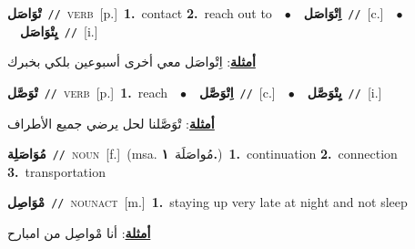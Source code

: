 \documentclass[10pt,a4paper,twoside]{article} %
\begin{document}
\begin{multicols}{2}
{\setlength\topsep{0pt}\textbf{\foreignlanguage{arabic}{تْوَاصَل}}\ {\color{gray}\texttt{//}\color{black}}\ \textsc{verb}\ [p.]\ \textbf{1.}~contact  \textbf{2.}~reach out to\ \ $\bullet$\ \ \setlength\topsep{0pt}\textbf{\foreignlanguage{arabic}{اِتْوَاصَل}}\ {\color{gray}\texttt{//}\color{black}}\ [c.]\ \ $\bullet$\ \ \setlength\topsep{0pt}\textbf{\foreignlanguage{arabic}{يِتْوَاصَل}}\ {\color{gray}\texttt{//}\color{black}}\ [i.]\  \begin{flushright}\color{gray}\foreignlanguage{arabic}{\textbf{\underline{\foreignlanguage{arabic}{أمثلة}}}: اِتْواصَل معي أخرى أسبوعين بلكي بخبرك}\end{flushright}\color{black}} \vspace{2mm}

{\setlength\topsep{0pt}\textbf{\foreignlanguage{arabic}{تْوَصَّل}}\ {\color{gray}\texttt{//}\color{black}}\ \textsc{verb}\ [p.]\ \textbf{1.}~reach\ \ $\bullet$\ \ \setlength\topsep{0pt}\textbf{\foreignlanguage{arabic}{اِتْوَصَّل}}\ {\color{gray}\texttt{//}\color{black}}\ [c.]\ \ $\bullet$\ \ \setlength\topsep{0pt}\textbf{\foreignlanguage{arabic}{يِتْوَصَّل}}\ {\color{gray}\texttt{//}\color{black}}\ [i.]\  \begin{flushright}\color{gray}\foreignlanguage{arabic}{\textbf{\underline{\foreignlanguage{arabic}{أمثلة}}}: تْوَصَّلنا لحل يرضي جميع الأطراف}\end{flushright}\color{black}} \vspace{2mm}

{\setlength\topsep{0pt}\textbf{\foreignlanguage{arabic}{مُوَاصَلِة}}\ {\color{gray}\texttt{//}\color{black}}\ \textsc{noun}\ [f.]\ \color{gray}(msa. \foreignlanguage{arabic}{مُواصَلَة}~\foreignlanguage{arabic}{\textbf{١.}})\color{black}\ \textbf{1.}~continuation  \textbf{2.}~connection  \textbf{3.}~transportation\ } \vspace{2mm}

{\setlength\topsep{0pt}\textbf{\foreignlanguage{arabic}{مْوَاصِل}}\ {\color{gray}\texttt{//}\color{black}}\ \textsc{noun\textunderscore act}\ [m.]\ \textbf{1.}~staying up very late at night and not sleep\  \begin{flushright}\color{gray}\foreignlanguage{arabic}{\textbf{\underline{\foreignlanguage{arabic}{أمثلة}}}: أنا مْواصِل من امبارح}\end{flushright}\color{black}} \vspace{2mm}


\end{multicols}
\end{document}
